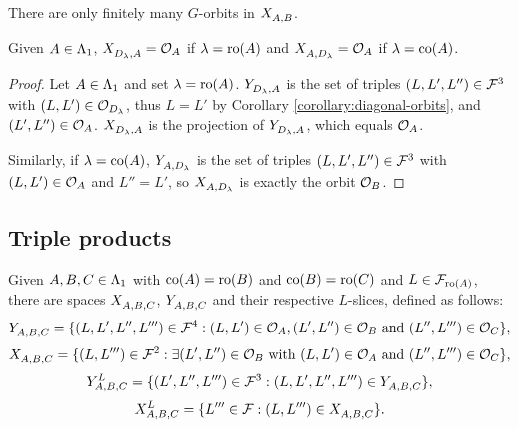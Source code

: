 \documentclass[a4paper, 11pt]{report}
\begin{document}
\begin{remark}
There are only finitely many $G$-orbits in $\xprod{A,B}$.
\end{remark}

\begin{lemma}\label{lemma:product-with-diagonal-orbits}
Given $A\in\matrices$, $\xprod{\diag{\lambda},A}=\orbit{A}$ if $\lambda=\ro{A}$ and $\xprod{A,\diag{\lambda}}=\orbit{A}$ if $\lambda=\co{A}$.
\end{lemma}

\begin{proof}
Let $A\in\matrices$ and set $\lambda=\ro{A}$. $\yprod{\diag{\lambda},A}$ is the set of triples $(L,L',L'')\in\flags^3$ with $(L,L')\in\orbit{\diag{\lambda}}$, thus $L=L'$ by Corollary \ref{corollary:diagonal-orbits}, and $(L',L'')\in\orbit{A}$. $\xprod{\diag{\lambda},A}$ is the projection of $\yprod{\diag{\lambda},A}$, which equals $\orbit{A}$.

Similarly, if $\lambda=\co{A}$, $\yprod{A,\diag{\lambda}}$ is the set of triples $(L,L',L'')\in\flags^3$ with $(L,L')\in\orbit{A}$ and $L''=L'$, so $\xprod{A,\diag{\lambda}}$ is exactly the orbit $\orbit{B}$.
\end{proof}

\subsection{Triple products}

Given $A,B,C\in\matrices$ with $\co{A}=\ro{B}$ and $\co{B}=\ro{C}$ and $L\in\flags_{\ro{A}}$, there are spaces $\xprod{A,B,C}$, $\yprod{A,B,C}$ and their respective $L$-slices, defined as follows:
\begin{equation*}
\yprod{A,B,C} = \{(L,L',L'',L''')\in\flags^4: (L,L')\in\orbit{A}, (L',L'')\in\orbit{B} \text{ and } (L'',L''')\in\orbit{C}\},
\end{equation*}
\begin{equation*}
\xprod{A,B,C} = \{(L,L''')\in\flags^2: \exists (L',L'')\in\orbit{B} \text{ with } (L,L')\in\orbit{A} \text{ and } (L'',L''')\in\orbit{C}\},
\end{equation*}
\begin{equation*}
\yprod[L]{A,B,C} = \{ (L',L'',L''')\in\flags^3: (L,L',L'',L''')\in\yprod{A,B,C}\},
\end{equation*}
\begin{equation*}
\xprod[L]{A,B,C} = \{ L'''\in\flags: (L,L''')\in\xprod{A,B,C}\}.
\end{equation*}
\end{document}
